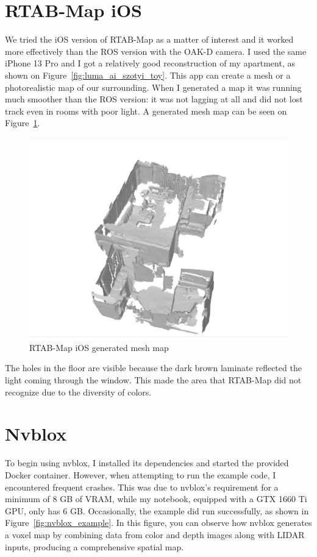 \FloatBarrier
\section{RTAB-Map iOS}

We tried the iOS version of RTAB-Map as a matter of interest and it worked more effectively than the ROS version with the OAK-D camera. I used the same iPhone 13 Pro and I got a relatively good reconstruction of my apartment, as shown on Figure~\ref{fig:luma_ai_szotyi_toy}. This app can create a mesh or a photorealistic map of our surrounding. When I generated a map it was running much smoother than the ROS version: it was not lagging at all and did not lost track even in rooms with poor light. A generated mesh map can be seen on Figure~\ref{fig:rtabmap_ios}.

\begin{figure}[htbp]
	\centering
	\includegraphics[width=150mm, keepaspectratio]{figures/rtabmap_ios.png}
	\caption{RTAB-Map iOS generated mesh map}
	\label{fig:rtabmap_ios}
\end{figure}

The holes in the floor are visible because the dark brown laminate reflected the light coming through the window. This made the area that RTAB-Map did not recognize due to the diversity of colors.

\section{Nvblox}

To begin using nvblox, I installed its dependencies and started the provided Docker container. However, when attempting to run the example code, I encountered frequent crashes. This was due to nvblox’s requirement for a minimum of 8 GB of VRAM, while my notebook, equipped with a GTX 1660 Ti GPU, only has 6 GB. Occasionally, the example did run successfully, as shown in Figure~\ref{fig:nvblox_example}. In this figure, you can observe how nvblox generates a voxel map by combining data from color and depth images along with LIDAR inputs, producing a comprehensive spatial map.

